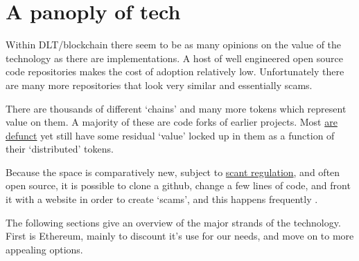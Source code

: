\section{A panoply of tech}
Within DLT/blockchain there seem to be as many opinions on the value of the technology as there are implementations. A host of well engineered open source code repositories makes the cost of adoption relatively low. Unfortunately there are many more repositories that look very similar and essentially scams.\par
There are thousands of different `chains' and many more tokens which represent value on them. A majority of these are code forks of earlier projects. Most \href{https://99bitcoins.com/deadcoins/}{are defunct} yet still have some residual `value' locked up in them as a function of their `distributed' tokens. \par 
Because the space is comparatively new, subject to \href{https://www.esma.europa.eu/press-news/consultations/call-evidence-dlt-pilot-regime}{scant regulation}, and often open source, it is possible to clone a github, change a few lines of code, and front it with a website in order to create `scams', and this happens frequently \cite{golumbia2020cryptocurrency}.\par
The following sections give an overview of the major strands of the technology. First is Ethereum, mainly to discount it's use for our needs, and move on to more appealing options.
